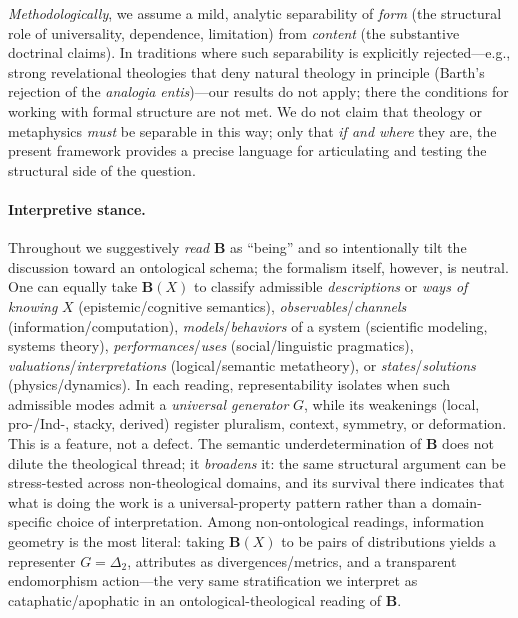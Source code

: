 \documentclass[11pt]{article}
\theoremstyle{upright}
\begin{document}
\emph{Methodologically}, we assume a mild, analytic separability of \emph{form} (the structural role of universality, dependence, limitation) from \emph{content} (the substantive doctrinal claims). In traditions where such separability is explicitly rejected—e.g., strong revelational theologies that deny natural theology in principle (Barth’s rejection of the \emph{analogia entis})—our results do not apply; there the conditions for working with formal structure are not met. We do not claim that theology or metaphysics \emph{must} be separable in this way; only that \emph{if and where} they are, the present framework provides a precise language for articulating and testing the structural side of the question.

\paragraph{Interpretive stance.}
Throughout we suggestively \emph{read} $\mathbf B$ as ``being'' and so intentionally tilt the discussion toward an ontological schema; the formalism itself, however, is neutral. One can equally take $\mathbf B(X)$ to classify admissible \emph{descriptions} or \emph{ways of knowing} $X$ (epistemic/cognitive semantics), \emph{observables}/\emph{channels} (information/computation), \emph{models}/\emph{behaviors} of a system (scientific modeling, systems theory), \emph{performances}/\emph{uses} (social/linguistic pragmatics), \emph{valuations}/\emph{interpretations} (logical/semantic metatheory), or \emph{states}/\emph{solutions} (physics/dynamics). In each reading, representability isolates when such admissible modes admit a \emph{universal generator} $G$, while its weakenings (local, pro-/Ind-, stacky, derived) register pluralism, context, symmetry, or deformation. This is a feature, not a defect. The semantic under\-determination of $\mathbf B$ does not dilute the theological thread; it \emph{broadens} it: the same structural argument can be stress-tested across non-theological domains, and its survival there indicates that what is doing the work is a universal-property pattern rather than a domain-specific choice of interpretation. Among non-ontological readings, information geometry is the most literal: taking $\mathbf B(X)$  to be pairs of distributions yields a representer \(G = \Delta_2\), attributes as divergences/metrics, and a transparent endomorphism action---the very same stratification we interpret as cataphatic/apophatic in an ontological-theological reading of $\mathbf B$.
\end{document}
